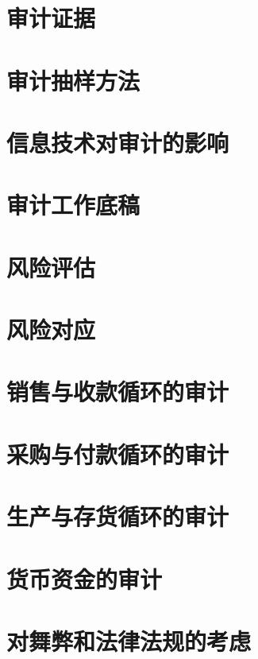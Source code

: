 \documentclass[UTF8,12pt]{ctexart}
\numberwithin{equation}{section} %
\numberwithin{figure}{section}
\numberwithin{table}{section}
\begin{document}
	
	\newpage
	\section{审计证据}	
	
	\newpage
	\section{审计抽样方法}
	
	\newpage
	\section{信息技术对审计的影响}
	
	\newpage
	\section{审计工作底稿}
	
	\newpage
	\section{风险评估}
	
	\newpage
	\section{风险对应}
	
	\newpage
	\section{销售与收款循环的审计}
	
	\newpage
	\section{采购与付款循环的审计}
	
	\newpage
	\section{生产与存货循环的审计}
	
	\newpage
	\section{货币资金的审计}
	
	\newpage
	\section{对舞弊和法律法规的考虑}
	
\end{document}
